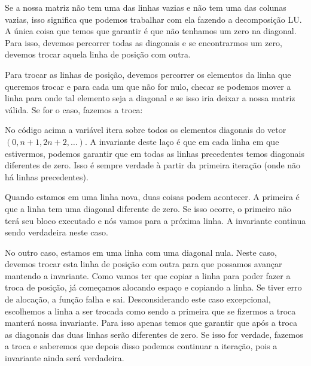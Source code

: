 Se a nossa matriz não tem uma das linhas vazias e não tem uma das
colunas vazias, isso significa que podemos trabalhar com ela fazendo a
decomposição LU. A única coisa que temos que garantir é que não
tenhamos um zero na diagonal. Para isso, devemos percorrer todas as
diagonais e se encontrarmos um zero, devemos trocar aquela linha de
posição com outra.

Para trocar as linhas de posição, devemos percorrer os elementos da
linha que queremos trocar e para cada um que não for nulo, checar se
podemos mover a linha para onde tal elemento seja a diagonal e se isso
iria deixar a nossa matriz válida. Se for o caso, fazemos a troca:


No código acima a variável  itera sobre todos os
elementos diagonais do vetor $(0, n+1, 2n+2, \ldots)$. A invariante
deste laço é que em cada linha em que estivermos, podemos garantir que
em todas as linhas precedentes temos diagonais diferentes de
zero. Isso é sempre verdade à partir da primeira iteração (onde não há
linhas precedentes).

Quando estamos em uma linha nova, duas coisas podem acontecer. A
primeira é que a linha tem uma diagonal diferente de zero. Se isso
ocorre, o primeiro  não terá seu bloco executado e nós
vamos para a próxima linha. A invariante continua sendo verdadeira
neste caso.

No outro caso, estamos em uma linha com uma diagonal nula. Neste caso,
devemos trocar esta linha de posição com outra para que possamos
avançar mantendo a invariante. Como vamos ter que copiar a linha para
poder fazer a troca de posição, já começamos alocando espaço e
copiando a linha. Se tiver erro de alocação, a função falha e
sai. Desconsiderando este caso excepcional, escolhemos a linha a ser
trocada como sendo a primeira que se fizermos a troca manterá nossa
invariante. Para isso apenas temos que garantir que após a troca as
diagonais das duas linhas serão diferentes de zero. Se isso for
verdade, fazemos a troca e saberemos que depois disso podemos
continuar a iteração, pois a invariante ainda será verdadeira.

